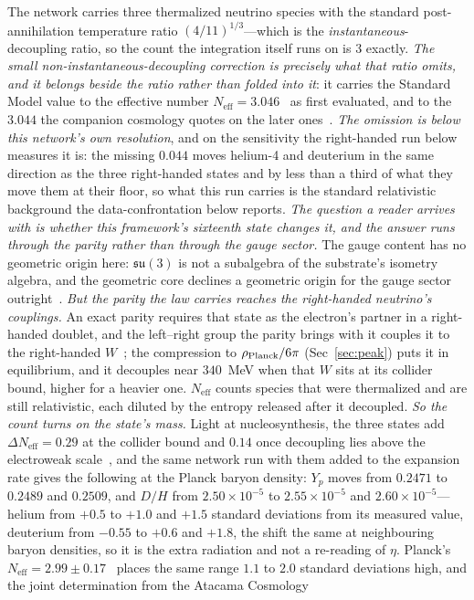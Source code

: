 \documentclass[11pt,a4paper]{article}
\theoremstyle{plain}
\theoremstyle{definition}
\theoremstyle{remark}
\begin{document}
The network carries three thermalized neutrino species with the standard post-annihilation temperature ratio $(4/11)^{1/3}$---which is the \emph{instantaneous}-decoupling ratio, so the count the integration itself runs on is $3$ exactly. \emph{The small non-instantaneous-decoupling correction is precisely what that ratio omits, and it belongs beside the ratio rather than folded into it}: it carries the Standard Model value to the effective number $N_{\mathrm{eff}}=3.046$~\cite{Mangano2005} as first evaluated, and to the $3.044$ the companion cosmology quotes on the later ones~\cite{JanzenCRcosmology}. \emph{The omission is below this network's own resolution}, and on the sensitivity the right-handed run below measures it is: the missing $0.044$ moves helium-4 and deuterium in the same direction as the three right-handed states and by less than a third of what they move them at their floor, so what this run carries is the standard relativistic background the data-confrontation below reports. \emph{The question a reader arrives with is whether this framework's sixteenth state changes it, and the answer runs through the parity rather than through the gauge sector.} The gauge content has no geometric origin here: $\mathfrak{su}(3)$ is not a subalgebra of the substrate's isometry algebra, and the geometric core declines a geometric origin for the gauge sector outright~\cite{JanzenGeometricCore, JanzenBoundary}. \emph{But the parity the law carries reaches the right-handed neutrino's couplings.} An exact parity requires that state as the electron's partner in a right-handed doublet, and the left--right group the parity brings with it couples it to the right-handed $W$~\cite{JanzenMatter,JanzenCRcosmology}; the compression to $\rho_{\rm Planck}/6\pi$ (Sec~\ref{sec:peak}) puts it in equilibrium, and it decouples near $340$~MeV when that $W$ sits at its collider bound, higher for a heavier one. $N_{\mathrm{eff}}$ counts species that were thermalized and are still relativistic, each diluted by the entropy released after it decoupled. \emph{So the count turns on the state's mass.} Light at nucleosynthesis, the three states add $\Delta N_{\mathrm{eff}}=0.29$ at the collider bound and $0.14$ once decoupling lies above the electroweak scale~\cite{JanzenCRcosmology}, and the same network run with them added to the expansion rate gives the following at the Planck baryon density: $Y_p$ moves from $0.2471$ to $0.2489$ and $0.2509$, and $D/H$ from $2.50\times10^{-5}$ to $2.55\times10^{-5}$ and $2.60\times10^{-5}$---helium from $+0.5$ to $+1.0$ and $+1.5$ standard deviations from its measured value, deuterium from $-0.55$ to $+0.6$ and $+1.8$, the shift the same at neighbouring baryon densities, so it is the extra radiation and not a re-reading of $\eta$. Planck's $N_{\mathrm{eff}}=2.99\pm0.17$~\cite{Planck2018} places the same range $1.1$ to $2.0$ standard deviations high, and the joint determination from the Atacama Cosmology 
\end{document}
